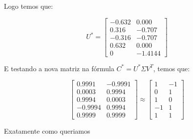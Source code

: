 \documentclass[11pt]{article}
\begin{document}
\begin{exerc}
\begin{enumerate}
Logo temos que:

\[
U^* = 
\begin{bmatrix}
    -0.632 & 0.000 \\
    0.316 & -0.707 \\
    -0.316 & -0.707 \\
    0.632 & 0.000 \\
    0 & -1.4144
\end{bmatrix}
\]

E testando a nova matriz na fórmula $C^* = U^* \Sigma V^T$, temos que:

\[
\begin{bmatrix}
    0.9991 & -0.9991 \\
    0.0003 & 0.9994 \\
    0.9994 & 0.0003 \\
    -0.9994 & 0.9994 \\
    0.9999 & 0.9999
\end{bmatrix}
\approx
\begin{bmatrix}
    1 & -1 \\
    0 & 1 \\
    1 & 0 \\
    -1 & 1 \\
    1 & 1
\end{bmatrix}
\]

Exatamente como queriamos

\end{enumerate}
\end{exerc}
\end{document}
